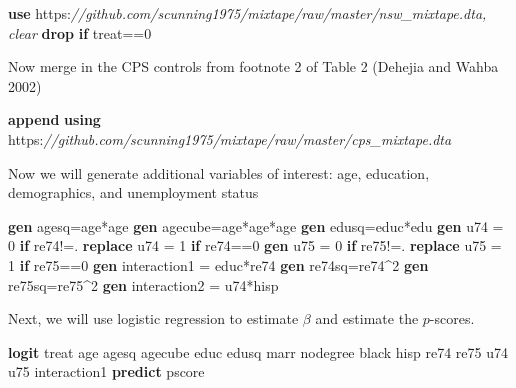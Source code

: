 \documentclass[
]{book}
\newenvironment{Shaded}{\begin{snugshade}}{\end{snugshade}}
\newcommand{\BaseNTok}[1]{\textcolor[rgb]{0.00,0.00,0.81}{#1}}
\newcommand{\CommentTok}[1]{\textcolor[rgb]{0.56,0.35,0.01}{\textit{#1}}}
\newcommand{\KeywordTok}[1]{\textcolor[rgb]{0.13,0.29,0.53}{\textbf{#1}}}
\newcommand{\NormalTok}[1]{#1}
\begin{document}
\begin{Shaded}
\begin{Highlighting}[]
\KeywordTok{use}\NormalTok{ https:}\CommentTok{//github.com/scunning1975/mixtape/raw/master/nsw\_mixtape.dta, clear}
\KeywordTok{drop} \KeywordTok{if}\NormalTok{ treat==0}
\end{Highlighting}
\end{Shaded}

Now merge in the CPS controls from footnote 2 of Table 2 (Dehejia and Wahba 2002)

\begin{Shaded}
\begin{Highlighting}[]
\KeywordTok{append} \KeywordTok{using}\NormalTok{ https:}\CommentTok{//github.com/scunning1975/mixtape/raw/master/cps\_mixtape.dta}
\end{Highlighting}
\end{Shaded}

Now we will generate additional variables of interest: age, education, demographics, and unemployment status

\begin{Shaded}
\begin{Highlighting}[]
\KeywordTok{gen}\NormalTok{ agesq=age*age}
\KeywordTok{gen}\NormalTok{ agecube=age*age*age}
\KeywordTok{gen}\NormalTok{ edusq=educ*edu}
\KeywordTok{gen}\NormalTok{ u74 = 0 }\KeywordTok{if}\NormalTok{ re74!=.}
\KeywordTok{replace}\NormalTok{ u74 = 1 }\KeywordTok{if}\NormalTok{ re74==0}
\KeywordTok{gen}\NormalTok{ u75 = 0 }\KeywordTok{if}\NormalTok{ re75!=.}
\KeywordTok{replace}\NormalTok{ u75 = 1 }\KeywordTok{if}\NormalTok{ re75==0}
\KeywordTok{gen}\NormalTok{ interaction1 = educ*re74}
\KeywordTok{gen}\NormalTok{ re74sq=re74\^{}2}
\KeywordTok{gen}\NormalTok{ re75sq=re75\^{}2}
\KeywordTok{gen}\NormalTok{ interaction2 = u74*hisp}
\end{Highlighting}
\end{Shaded}

Next, we will use logistic regression to estimate \(\beta\) and estimate the \(p\)-scores.

\begin{Shaded}
\begin{Highlighting}[]
\KeywordTok{logit}\NormalTok{ treat age agesq agecube educ edusq marr nodegree }\BaseNTok{black}\NormalTok{ hisp re74 re75 u74 u75 interaction1 }
\KeywordTok{predict}\NormalTok{ pscore}
\end{Highlighting}
\end{Shaded}
\end{document}
